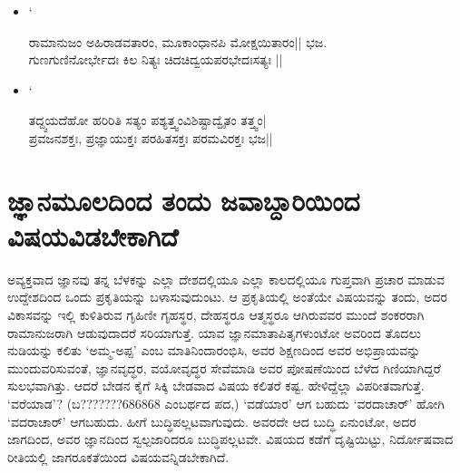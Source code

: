 \begin{itemize}

 `

\item[] `
\begin{shloka}
ರಾಮಾನುಜಂ ಅಹಿರಾಡವತಾರಂ, ಮೂಕಾಂಧಾನಪಿ ಮೋಕ್ಷಯಿತಾರಂ|| ಭಜ.\\
ಗುಣಗುಣಿನೋರ್ಭೇದಃ ಕಿಲ ನಿತ್ಯಃ ಚಿದಚಿದ್ವಯಪರಭೇದಃಸತ್ಯಃ || 
\end{shloka}

\item[] `
\begin{shloka}
ತದ್ದ್ವಯದೆಹೋ ಹರಿರಿತಿ ಸತ್ಯಂ ಪಶ್ಯತ್ತ್ವಂವಿಶಿಷ್ಟಾದ್ವೈತಂ ತತ್ತ್ವಂ|\\
ಪ್ರವಜನಶಕ್ತಃ, ಪ್ರಜ್ಞಾಯುಕ್ತಃ ಪರಹಿತಸಕ್ತಃ ಪರಮವಿರಕ್ತಃ ಭಜ||
\end{shloka}

 

\end{itemize}

\section*{ಜ್ಞಾನಮೂಲದಿಂದ ತಂದು ಜವಾಬ್ದಾರಿಯಿಂದ ವಿಷಯವಿಡಬೇಕಾಗಿದೆ}

ಅವ್ಯಕ್ತವಾದ ಜ್ಞಾನವು ತನ್ನ ಬೆಳಕನ್ನು ಎಲ್ಲಾ ದೇಶದಲ್ಲಿಯೂ ಎಲ್ಲಾ ಕಾಲದಲ್ಲಿಯೂ ಗುಪ್ತವಾಗಿ ಪ್ರಚಾರ ಮಾಡುವ ಉದ್ದೇಶದಿಂದ ಒಂದು ಪ್ರಕೃತಿಯನ್ನು ಬಳಾಸುವುದುಂಟು. ಆ ಪ್ರಕೃತಿಯಲ್ಲಿ ಅಂತೆಯೇ ವಿಷಯವನ್ನು ತಂದು, ಅದರ ವಿಕಾಸವನ್ನು ಇಲ್ಲಿ ಕುಳಿತಿರುವ ಗೃಹಿಣೀ ಗೃಹಸ್ಥರ, ದೇಹಸ್ಥರೂ ಆತ್ಮಸ್ಥರೂ ಆಗಿರುವವರ ಮುಂದೆ ಶಂಕರರಾಗಿ ರಾಮಾನುಜರಾಗಿ ಆಡುವುದಾದರೆ ಸರಿಯಾಗುತ್ತೆ. ಯಾವ ಜ್ಞಾನಮಾತಾಪಿತೃಗಳುಂಟೋ ಅವರಿಂದ ತೊದಲು ನುಡಿಯನ್ನು ಕಲಿತು `ಅಮ್ಮ-ಅಪ್ಪ' ಎಂಬ ಮಾತಿನಿಂದಾರಂಭಿಸಿ, ಅವರ ಶಿಕ್ಷಣದಿಂದ ಅವರ ಅಭಿಪ್ರಾಯವನ್ನು ಮುಂದುವರಿಸುವಂತೆ, ಜ್ಞಾನವೃದ್ಧರ, ವಯೋವೃದ್ಧರ ಸೇವೆಮಾಡಿ ಅವರ ಪೋಷಣೆಯಿಂದ ಬೆಳೆದ ಗಿಣಿಯಾಗಿದ್ದರೆ ಸುಲಭವಾಗಿತ್ತು. ಆದರೆ ಬೇಡನ ಕೈಗೆ ಸಿಕ್ಕಿ ಬೇಡವಾದ ವಿಷಯ ಕಲಿತರೆ ಕಷ್ಟ. ಹೇಳಿದ್ದೆಲ್ಲಾ ವಿಪರೀತವಾಗುತ್ತೆ. `ವರೆಯಾಡ'? (ಬ???????686868 ಎಂಬರ್ಥದ ಪದ,) `ವಡೆಯಾರ' ಆಗ ಬಹುದು `ವರದಾಚಾರ್' ಹೋಗಿ `ವದರಾಚಾರ್' ಆಗಬಹುದು. ಹೀಗೆ ಬುದ್ಧಿಪಲ್ಲಟವಾಗುವುದು. ಅವರದೇ ಆದ ಬುದ್ಧಿ ಏನುಂಟೋ, ಅದರ ಜಾಗದಿಂದ, ಅವರ ಜ್ಞಾನದಿಂದ ಸ್ವಲ್ಪಜಾರಿದರೂ ಬುದ್ಧಿಪಲ್ಲಟವೇ. ವಿಷಯದ ಕಡೆಗೆ ದೃಷ್ಟಿಯಿಟ್ಟು, ನಿರ್ದೋಷವಾದ ರೀತಿಯಲ್ಲಿ ಜಾಗರೂಕತೆಯಿಂದ ವಿಷಯವನ್ನಿಡಬೇಕಾಗಿದೆ.

